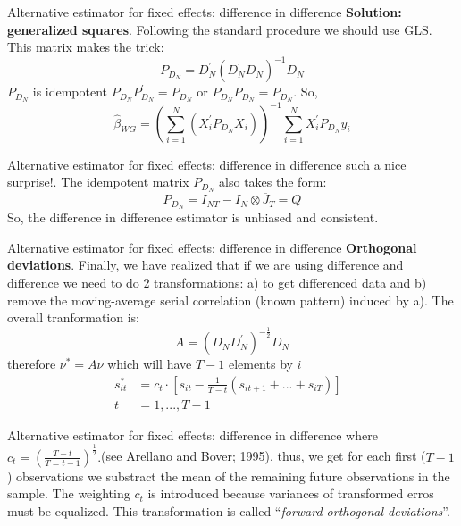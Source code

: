 \begin{frame}{Alternative estimator for fixed effects: difference in difference}
	\textbf{Solution: generalized squares}. Following the standard procedure we should use GLS. This matrix makes the trick:
		$$P_{D_{N}}=D_{N}^{\prime }\left( D_{N}^{\prime }D_{N}\right) ^{-1}D_{N}$$
	$P_{D_{N}}$ is idempotent $P_{D_{N}}P_{D_{N}}^{\prime }=P_{D_{N}}$ or $P_{D_{N}}P_{D_{N}}=P_{D_{N}}.$ So,
		$$\widehat{\beta }_{WG}=\left( \sum_{i=1}^{N}\left( X_{i}^{\prime
		}P_{D_{N}}X_{i}\right) \right) ^{-1}\sum_{i=1}^{N}X_{i}^{\prime
		}P_{D_{N}}y_{i}$$
\end{frame}
\begin{frame}{Alternative estimator for fixed effects: difference in difference}
	such a nice surprise!. The idempotent matrix $P_{D_{N}}$ also takes the form:
		$$P_{D_{N}}=I_{NT}-I_{N}\otimes \overline{J}_{T}=Q$$
	So, the difference in difference estimator is unbiased and consistent.
\end{frame}
\begin{frame}{Alternative estimator for fixed effects: difference in difference}
	\textbf{Orthogonal deviations}. Finally, we have realized that if we are using difference and difference we need to do 2 transformations: a) to get differenced data and b) remove the moving-average serial correlation (known pattern) induced by a). The overall tranformation is:
		$$A=\left( D_{N}D_{N}^{\prime }\right) ^{-\frac{1}{2}}D_{N}$$
	therefore $\nu ^{\ast }=A\nu $ which will have $T-1$ elements by $i$
		\begin{align*}
			s_{it}^{\ast } & = c_{t}\cdot \left[s_{it}-\frac{1}{T-t}\left(s_{it+1}+...+s_{iT}\right) \right] \text{ } \\
			t & = 1,...,T-1
		\end{align*}
\end{frame}
\begin{frame}{Alternative estimator for fixed effects: difference in difference}
	where $c_{t}=\left( \frac{T-t}{T=t-1}\right)^{\frac{1}{2}}.$(see Arellano and Bover; 1995). thus, we get for each first ($T-1$) observations we substract the mean of the remaining future observations in the sample. The weighting $c_{t}$ is introduced because variances of transformed erros must be equalized. This transformation is called ``\emph{forward orthogonal deviations}''.
\end{frame}
